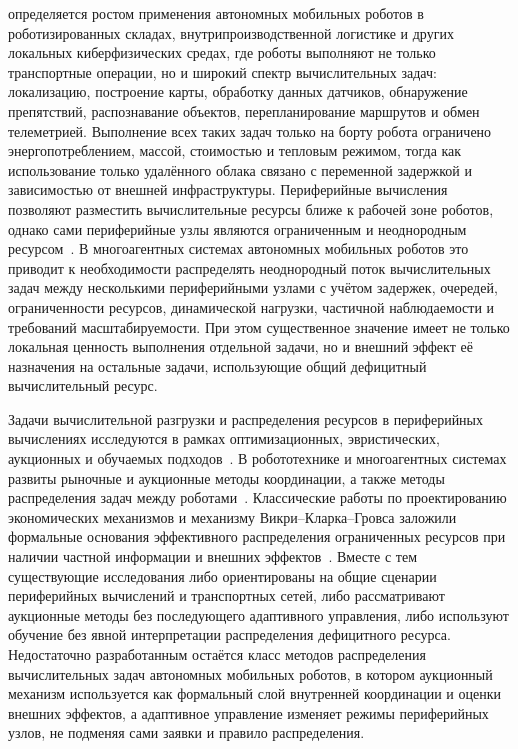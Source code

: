 \actuality определяется ростом применения автономных мобильных роботов в роботизированных складах, внутрипроизводственной логистике и других локальных киберфизических средах, где роботы выполняют не только транспортные операции, но и широкий спектр вычислительных задач: локализацию, построение карты, обработку данных датчиков, обнаружение препятствий, распознавание объектов, перепланирование маршрутов и обмен телеметрией.
Выполнение всех таких задач только на борту робота ограничено энергопотреблением, массой, стоимостью и тепловым режимом, тогда как использование только удалённого облака связано с переменной задержкой и зависимостью от внешней инфраструктуры.
Периферийные вычисления позволяют разместить вычислительные ресурсы ближе к рабочей зоне роботов, однако сами периферийные узлы являются ограниченным и неоднородным ресурсом~\cite{Shi2016Edge,Satyanarayanan2017Emergence,Mao2017MECPerspective,Mach2017MECSurvey,Tahir2025EdgeRoboticsSurvey}.
В многоагентных системах автономных мобильных роботов это приводит к необходимости распределять неоднородный поток вычислительных задач между несколькими периферийными узлами с учётом задержек, очередей, ограниченности ресурсов, динамической нагрузки, частичной наблюдаемости и требований масштабируемости.
При этом существенное значение имеет не только локальная ценность выполнения отдельной задачи, но и внешний эффект её назначения на остальные задачи, использующие общий дефицитный вычислительный ресурс.

\progress Задачи вычислительной разгрузки и распределения ресурсов в периферийных вычислениях исследуются в рамках оптимизационных, эвристических, аукционных и обучаемых подходов~\cite{Mao2017MECPerspective,Mach2017MECSurvey,Luo2021ResourceScheduling,Qiu2022AuctionEdgeSurvey,Ismail2025DRLMECSurvey,Hady2025MARLRAOSurvey}.
В робототехнике и многоагентных системах развиты рыночные и аукционные методы координации, а также методы распределения задач между роботами~\cite{Gerkey2004FormalMRTA,Dias2006MarketBasedMR}.
Классические работы по проектированию экономических механизмов и механизму Викри--Кларка--Гровса заложили формальные основания эффективного распределения ограниченных ресурсов при наличии частной информации и внешних эффектов~\cite{Vickrey1961Counterspeculation,Clarke1971MultipartPricing,Groves1973IncentivesTeams,NisanRonen2001AMD}.
Вместе с тем существующие исследования либо ориентированы на общие сценарии периферийных вычислений и транспортных сетей, либо рассматривают аукционные методы без последующего адаптивного управления, либо используют обучение без явной интерпретации распределения дефицитного ресурса.
Недостаточно разработанным остаётся класс методов распределения вычислительных задач автономных мобильных роботов, в котором аукционный механизм используется как формальный слой внутренней координации и оценки внешних эффектов, а адаптивное управление изменяет режимы периферийных узлов, не подменяя сами заявки и правило распределения.

